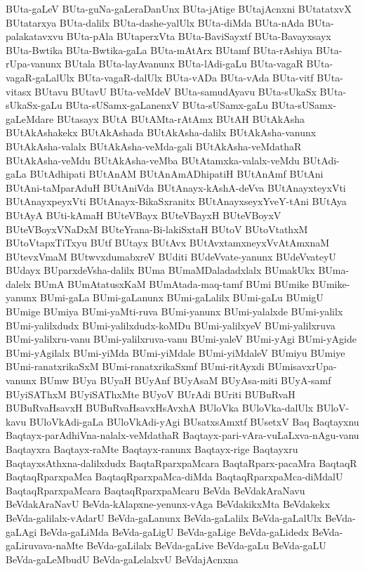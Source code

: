 {BUta-gaLeV
BUta-guNa-gaLeraDanUnx
BUta-jAtige
BUtajAcnxni
BUtatatxvX
BUtatarxya
BUta-dalilx
BUta-dashe-yalUlx
BUta-diMda
BUta-nAda
BUta-palakatavxvu
BUta-pAla
BUtaperxVta
BUta-BaviSayxtf
BUta-Bavayxsayx
BUta-Bwtika
BUta-Bwtika-gaLa
BUta-mAtArx
BUtamf
BUta-rAshiya
BUta-rUpa-vanunx
BUtala
BUta-layAvanunx
BUta-lAdi-gaLu
BUta-vagaR
BUta-vagaR-gaLalUlx
BUta-vagaR-dalUlx
BUta-vADa
BUta-vAda
BUta-vitf
BUta-vitasx
BUtavu
BUtavU
BUta-veMdeV
BUta-samudAyavu
BUta-sUkaSx
BUta-sUkaSx-gaLu
BUta-sUSamx-gaLanenxV
BUta-sUSamx-gaLu
BUta-sUSamx-gaLeMdare
BUtasayx
BUtA
BUtAMta-rAtAmx
BUtAH
BUtAkAsha
BUtAkAshakekx
BUtAkAshada
BUtAkAsha-dalilx
BUtAkAsha-vanunx
BUtAkAsha-valalx
BUtAkAsha-veMda-gali
BUtAkAsha-veMdathaR
BUtAkAsha-veMdu
BUtAkAsha-veMba
BUtAtamxka-valalx-veMdu
BUtAdi-gaLa
BUtAdhipati
BUtAnAM
BUtAnAmADhipatiH
BUtAnAmf
BUtAni
BUtAni-taMparAduH
BUtAniVda
BUtAnayx-kAshA-deVva
BUtAnayxteyxVti
BUtAnayxpeyxVti
BUtAnayx-BikaSxranitx
BUtAnayxseyxYveY-tAni
BUtAya
BUtAyA
BUti-kAmaH
BUteVBayx
BUteVBayxH
BUteVBoyxV
BUteVBoyxVNaDxM
BUteYrana-Bi-lakiSxtaH
BUtoV
BUtoVtathxM
BUtoVtapxTiTxyu
BUtf
BUtayx
BUtAvx
BUtAvxtamxneyxVvAtAmxnaM
BUtevxVmaM
BUtwvxdumabxreV
BUditi
BUdeVvate-yanunx
BUdeVvateyU
BUdayx
BUparxdeVsha-dalilx
BUma
BUmaMDaladadxlalx
BUmakUkx
BUma-dalelx
BUmA
BUmAtatusxKaM
BUmAtada-maq-tamf
BUmi
BUmike
BUmike-yanunx
BUmi-gaLa
BUmi-gaLanunx
BUmi-gaLalilx
BUmi-gaLu
BUmigU
BUmige
BUmiya
BUmi-yaMti-ruva
BUmi-yanunx
BUmi-yalalxde
BUmi-yalilx
BUmi-yalilxdudx
BUmi-yalilxdudx-koMDu
BUmi-yalilxyeV
BUmi-yalilxruva
BUmi-yalilxru-vanu
BUmi-yalilxruva-vanu
BUmi-yaleV
BUmi-yAgi
BUmi-yAgide
BUmi-yAgilalx
BUmi-yiMda
BUmi-yiMdale
BUmi-yiMdaleV
BUmiyu
BUmiye
BUmi-ranatxrikaSxM
BUmi-ranatxrikaSxmf
BUmi-ritAyxdi
BUmisavxrUpa-vanunx
BUmw
BUya
BUyaH
BUyAnf
BUyAsaM
BUyAsa-miti
BUyA-samf
BUyiSAThxM
BUyiSAThxMte
BUyoV
BUrAdi
BUriti
BUBuRvaH
BUBuRvaHsavxH
BUBuRvaHsavxHsAvxhA
BUloVka
BUloVka-dalUlx
BUloV-kavu
BUloVkAdi-gaLa
BUloVkAdi-yAgi
BUsatxsAmxtf
BUsetxV
Baq
Baqtayxnu
Baqtayx-parAdhiVna-nalalx-veMdathaR
Baqtayx-pari-vAra-vuLaLxva-nAgu-vanu
Baqtayxra
Baqtayx-raMte
Baqtayx-ranunx
Baqtayx-rige
Baqtayxru
BaqtayxsAthxna-dalilxdudx
BaqtaRparxpaMcara
BaqtaRparx-pacaMra
BaqtaqR
BaqtaqRparxpaMca
BaqtaqRparxpaMca-diMda
BaqtaqRparxpaMca-diMdalU
BaqtaqRparxpaMcara
BaqtaqRparxpaMcaru
BeVda
BeVdakAraNavu
BeVdakAraNavU
BeVda-kAlapxne-yenunx-vAga
BeVdakikxMta
BeVdakekx
BeVda-galilalx-vAdarU
BeVda-gaLanunx
BeVda-gaLalilx
BeVda-gaLalUlx
BeVda-gaLAgi
BeVda-gaLiMda
BeVda-gaLigU
BeVda-gaLige
BeVda-gaLidedx
BeVda-gaLiruvava-naMte
BeVda-gaLilalx
BeVda-gaLive
BeVda-gaLu
BeVda-gaLU
BeVda-gaLeMbudU
BeVda-gaLelalxvU
BeVdajAcnxna
}
